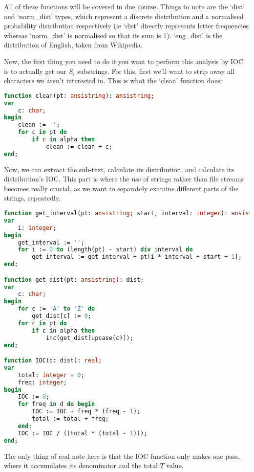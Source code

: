\documentclass{article}
\begin{document}
    All of these functions will be covered in due course. Things to note are
    the `dist' and `norm\_dist' types, which represent a discrete distribution
    and a normalised probability distribution respectively (ie `dist' directly
    represents letter frequencies whereas `norm\_dist' is normalised so that
    its sum is 1). `eng\_dist' is the distribution of English, taken from
    Wikipedia.

    Now, the first thing you need to do if you want to perform this analysis by
    IOC is to actually get our $S_i$ substrings. For this, first we'll want to
    strip away all characters we aren't interested in. This is what the `clean'
    function does:

\begin{lstlisting}[language=Pascal, caption=Clean function]
function clean(pt: ansistring): ansistring;
var
    c: char;
begin
    clean := '';
    for c in pt do
        if c in alpha then
            clean := clean + c;
end;
\end{lstlisting}

    Now, we can extract the sub-text, calculate its distribution, and calculate
    its distribution's IOC. This part is where the use of strings rather than
    file streams becomes really crucial, as we want to separately examine
    different parts of the strings, repeatedly.

\begin{lstlisting}[language=Pascal, caption=The rest of the owl (IOC functions)]
function get_interval(pt: ansistring; start, interval: integer): ansistring;
var
    i: integer;
begin
    get_interval := '';
    for i := 0 to (length(pt) - start) div interval do
        get_interval := get_interval + pt[i * interval + start + 1];
end;

function get_dist(pt: ansistring): dist;
var
    c: char;
begin
    for c := 'A' to 'Z' do
        get_dist[c] := 0;
    for c in pt do
        if c in alpha then
            inc(get_dist[upcase(c)]);
end;

function IOC(d: dist): real;
var
    total: integer = 0;
    freq: integer;
begin
    IOC := 0;
    for freq in d do begin
        IOC := IOC + freq * (freq - 1);
        total := total + freq;
    end;
    IOC := IOC / ((total * (total - 1)));
end;
\end{lstlisting}

    The only thing of real note here is that the IOC function only makes one
    pass, where it accumulates its denominator and the total $T$ value.
\end{document}
